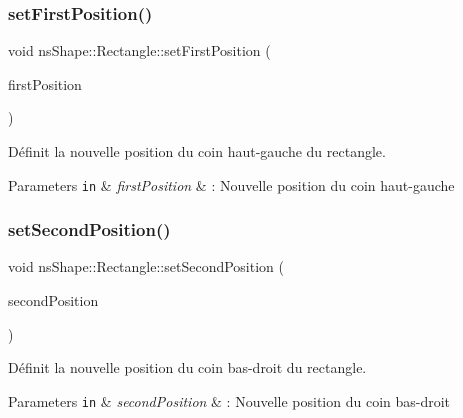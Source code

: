 \subsubsection{\texorpdfstring{set\+First\+Position()}{setFirstPosition()}}
{\footnotesize\ttfamily void ns\+Shape\+::\+Rectangle\+::set\+First\+Position (\begin{DoxyParamCaption}\item[{const \hyperlink{classns_graphics_1_1_vec2_d}{ns\+Graphics\+::\+Vec2D} \&}]{first\+Position }\end{DoxyParamCaption})}



Définit la nouvelle position du coin haut-\/gauche du rectangle. 


\begin{DoxyParams}[1]{Parameters}
\mbox{\tt in}  & {\em first\+Position} & \+: Nouvelle position du coin haut-\/gauche \\
\hline
\end{DoxyParams}
\mbox{\label{classns_shape_1_1_rectangle_ada11c6f627048c51dce9544bff758db4}} 
\subsubsection{\texorpdfstring{set\+Second\+Position()}{setSecondPosition()}}
{\footnotesize\ttfamily void ns\+Shape\+::\+Rectangle\+::set\+Second\+Position (\begin{DoxyParamCaption}\item[{const \hyperlink{classns_graphics_1_1_vec2_d}{ns\+Graphics\+::\+Vec2D} \&}]{second\+Position }\end{DoxyParamCaption})}



Définit la nouvelle position du coin bas-\/droit du rectangle. 


\begin{DoxyParams}[1]{Parameters}
\mbox{\tt in}  & {\em second\+Position} & \+: Nouvelle position du coin bas-\/droit \\
\hline
\end{DoxyParams}
\mbox{\label{classns_shape_1_1_rectangle_a9fcdc9a8adbc91cd2613a0d50058f829}} 
